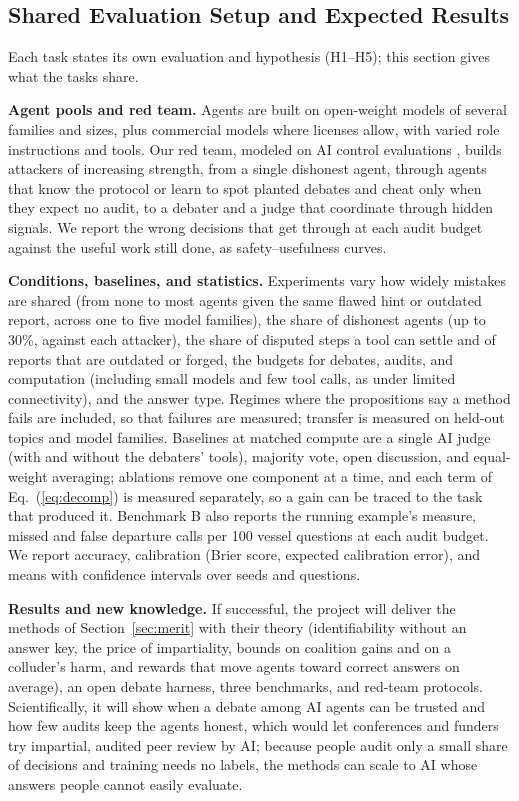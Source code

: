 \documentclass[12pt,letterpaper]{article}
\newcommand{\hd}[1]{\ifhmode\par\fi\addvspace{1pt}\noindent\textbf{#1}\hspace{0.35em}}
\begin{document}
\subsection{Shared Evaluation Setup and Expected Results}\label{sec:eval}
Each task states its own evaluation and hypothesis (H1--H5); this section gives what the tasks share.


\hd{Agent pools and red team.} Agents are built on open-weight models of several families and sizes, plus commercial models where licenses allow, with varied role instructions and tools. Our red team, modeled on AI control evaluations \citep{greenblatt2024control}, builds attackers of increasing strength, from a single dishonest agent, through agents that know the protocol or learn to spot planted debates and cheat only when they expect no audit, to a debater and a judge that coordinate through hidden signals. We report the wrong decisions that get through at each audit budget against the useful work still done, as safety--usefulness curves.

\hd{Conditions, baselines, and statistics.} Experiments vary how widely mistakes are shared (from none to most agents given the same flawed hint or outdated report, across one to five model families), the share of dishonest agents (up to 30\%, against each attacker), the share of disputed steps a tool can settle and of reports that are outdated or forged, the budgets for debates, audits, and computation (including small models and few tool calls, as under limited connectivity), and the answer type. Regimes where the propositions say a method fails are included, so that failures are measured; transfer is measured on held-out topics and model families. Baselines at matched compute are a single AI judge (with and without the debaters' tools), majority vote, open discussion, and equal-weight averaging; ablations remove one component at a time, and each term of Eq.~(\ref{eq:decomp}) is measured separately, so a gain can be traced to the task that produced it. Benchmark B also reports the running example's measure, missed and false departure calls per 100 vessel questions at each audit budget. We report accuracy, calibration (Brier score, expected calibration error), and means with confidence intervals over seeds and questions.

\label{sec:expected}\hd{Results and new knowledge.} If successful, the project will deliver the methods of Section~\ref{sec:merit} with their theory (identifiability without an answer key, the price of impartiality, bounds on coalition gains and on a colluder's harm, and rewards that move agents toward correct answers on average), an open debate harness, three benchmarks, and red-team protocols. Scientifically, it will show when a debate among AI agents can be trusted and how few audits keep the agents honest, which would let conferences and funders try impartial, audited peer review by AI; because people audit only a small share of decisions and training needs no labels, the methods can scale to AI whose answers people cannot easily evaluate.
\end{document}
